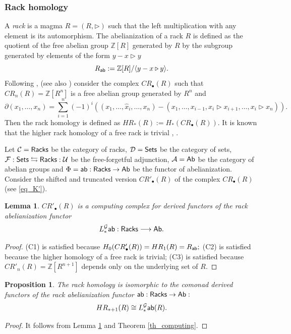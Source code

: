 \documentclass{amsart}
\numberwithin{equation}{section}
\newtheorem{lemma}[theorem]{Lemma}
\newtheorem{proposition}[theorem]{Proposition}
\theoremstyle{definition}
\def\CC{\mathcal{C}}
\def\FF{\mathcal{F}}
\def\GG{\mathcal{G}}
\def\UU{\mathcal{U}}
\def\DD{\mathcal{D}}
\def\AA{\mathcal{A}}
\def\ZZ{\mathbb{Z}}
\begin{document}
\subsubsection{Rack homology} A \emph{rack} is a magma  $R=(R,\triangleright)$  such that the left multiplication with any element is its automorphism. The abelianization of a rack $R$ 
is defined as the quotient of the free abelian group $\ZZ[R]$ generated by $R$ by the subgroup generated by elements of the form $y-x\triangleright y$
$$R_{\sf ab}:=\ZZ[R]/\langle y-x\triangleright y \rangle.$$ Following \cite{fenn1995trunks}, \cite{fenn2007rack} (see also   \cite{szymik2019quandle}) consider the complex $CR_\bullet(R)$ such that $CR_n(R)=\ZZ[R^n]$ is a free abelian group generated by $R^n$ and 
$$\partial(x_1,\dots,x_n)=\sum_{i=1}^n (-1)^i ((x_1,\dots,\hat x_i,\dots,x_n) - (x_1,\dots,x_{i-1},x_i \triangleright x_{i+1}, \dots,x_i \triangleright x_n)).$$
Then the rack homology is defined as $HR_*(R):=H_*(CR_\bullet(R)).$ It is known that the higher rack homology of a free rack is trivial \cite{farinati2014homology},  \cite[Th.5.13]{fenn2007rack}. 

Let $\CC={\sf Racks}$ be the category of racks, $\DD={\sf Sets}$ be the category of sets,  $\FF:{\sf Sets}\leftrightarrows {\sf Racks}:\UU$ be the free-forgetful adjunction, $\AA={\sf Ab}$ be the category of abelian groups and $\Phi={\sf ab}:{\sf Racks}\to {\sf Ab}$ be the functor of abelianization.
Consider the shifted and truncated version ${CR}'_\bullet(R)$ of the complex ${CR}_\bullet(R)$ (see \eqref{eq_K'}).

\begin{lemma}\label{lemma_rack}
${CR}'_\bullet(R)$ is a computing complex for derived functors of the rack abelianization functor 
$$L^\GG_*{\sf ab}:{\sf Racks}\longrightarrow {\sf Ab}.$$
\end{lemma}
\begin{proof}
(C1) is satisfied because $H_0(CR'_\bullet(R))=HR_1(R)=R_{\sf ab};$ (C2) is satisfied because the higher homology of a free rack is trivial; (C3) is satisfied because $CR'_n(R)=\ZZ[R^{n+1}]$ depends only on the underlying set of $R.$
\end{proof}



\begin{proposition}
The rack homology is isomorphic to the comonad derived functors of the rack abelianization functor ${\sf ab}:{\sf Racks}\to {\sf Ab}:$
$$HR_{*+1}(R)\cong L^\GG_*{\sf ab}(R).$$
\end{proposition}
\begin{proof} It follows from Lemma \ref{lemma_rack} and
Theorem \ref{th_computing}.
\end{proof}
\end{document}
